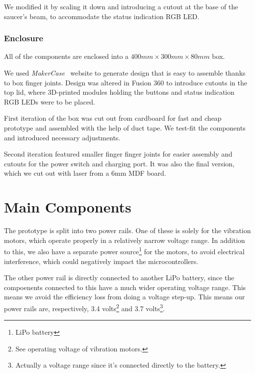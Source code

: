 \documentclass[acmsmall]{acmart}
\begin{document}
We modified it by scaling it down and introducing a cutout at the base of the saucer's beam, to accommodate the status indication RGB LED.


\subsubsection{Enclosure}

All of the components are enclosed into a $400mm \times 300mm \times 80mm$ box.

We used \textit{MakerCase}~\cite{makercase_basicBox} website to generate design that is easy to assemble thanks to box finger joints. Design was altered in Fusion 360 to introduce cutouts in the top lid, where 3D-printed modules holding the buttons and status indication RGB LEDs were to be placed.

First iteration of the box was cut out from cardboard for fast and cheap prototype and assembled with the help of duct tape. We test-fit the components and introduced necessary adjustments.

Second iteration featured smaller finger finger joints for easier assembly and cutouts for the power switch and charging port. It was also the final version, which we cut out with laser from a 6mm MDF board.
 

\section{Main Components} %

The prototype is split into two power rails. One of these is solely for the vibration motors, which operate properly in a relatively
narrow voltage range. In addition to this, we also have a separate power source\footnote{LiPo battery} for the motors, to avoid electrical interference,
which could negatively impact the microcontrollers.

The other power rail is directly connected to another LiPo battery, since the compoenents connected to this have a much wider 
operating voltage range. This means we avoid the efficiency loss from doing a voltage step-up. 
This means our power rails are, respectively, 3.4 volts\footnote{See operating voltage of vibration motors.} 
and 3.7 volts\footnote{Actually a voltage range since it's connected directly to the battery.}. 
\end{document}
